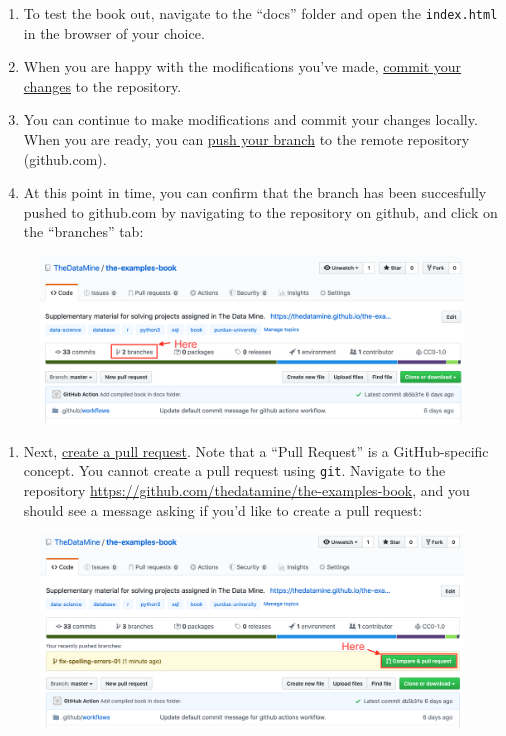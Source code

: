 \documentclass[]{book}
\providecommand{\tightlist}{%
  \setlength{\itemsep}{0pt}\setlength{\parskip}{0pt}}
\begin{document}
\begin{enumerate}
\def\labelenumi{\arabic{enumi}.}
\setcounter{enumi}{14}
\tightlist
\item
  To test the book out, navigate to the ``docs'' folder and open the
  \texttt{index.html} in the browser of your choice.
\item
  When you are happy with the modifications you've made,
  \protect\hyperlink{git-commit-changes}{commit your changes} to the
  repository.
\item
  You can continue to make modifications and commit your changes
  locally. When you are ready, you can
  \protect\hyperlink{git-push-local-commits}{push your branch} to the
  remote repository (github.com).
\item
  At this point in time, you can confirm that the branch has been
  succesfully pushed to github.com by navigating to the repository on
  github, and click on the ``branches'' tab:
\end{enumerate}

\begin{figure}
\centering
\includegraphics{./images/gh-desktop-14.png}
\caption{}
\end{figure}

\begin{enumerate}
\def\labelenumi{\arabic{enumi}.}
\setcounter{enumi}{18}
\tightlist
\item
  Next, \href{}{create a pull request}. Note that a ``Pull Request'' is
  a GitHub-specific concept. You cannot create a pull request using
  \texttt{git}. Navigate to the repository
  \url{https://github.com/thedatamine/the-examples-book}, and you should
  see a message asking if you'd like to create a pull request:
\end{enumerate}

\begin{figure}
\centering
\includegraphics{./images/pr-01.png}
\caption{}
\end{figure}
\end{document}
